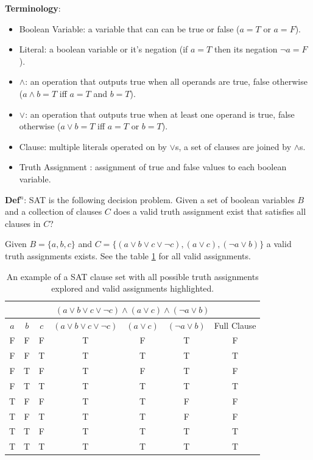 \documentclass[a4paper,11pt]{report}
\newcounter{row}
\newcounter{col}
\begin{document}
\textbf{Terminology}:
\begin{itemize}
\item Boolean Variable: a variable that can can be true or false ($a=T$ or $a=F$).
\item Literal: a boolean variable or it's negation (if $a = T$ then its negation $\neg a = F$).
\item $\land$: an operation that outputs true when all operands are true, false otherwise ($a\land b = T$ iff $a=T$ and $b=T$).
\item $\lor$: an operation that outputs true when at least one operand is true, false otherwise ($a\lor b = T$ iff $a=T$ or $b=T$).
\item Clause: multiple literals operated on by $\lor$s, a set of clauses are joined by $\land$s.
\item Truth Assignment : assignment of true and false values to each boolean variable. 
\end{itemize}

\textbf{Def$^n$}: SAT is the following decision problem. Given a set of boolean variables $B$ and a collection of clauses $C$ does a valid truth assignment exist that satisfies all clauses in $C$?

Given $B = \{a,b,c\}$ and  $C=\{(a\lor b \lor c \lor \neg c), (a \lor c), (\neg a\lor b)\}$ a valid truth assignments exists. See the table \ref{satex} for all valid assignments.

\begin{table}
\begin{center}
\begin{tabular}{ |c|c|c|c|c|c|c|  }
 \hline
 \multicolumn{7}{|c|}{$(a\lor b \lor c \lor \neg c)\land (a \lor c) \land (\neg a\lor b)$} \\
 \hline
$a$ & $b$ & $c$ & $(a\lor b \lor c \lor \neg c)$ & $(a \lor c)$ & $(\neg a\lor b)$ & Full Clause\\
 \hline
 F & F & F & T & F & T & F \\
\rowcolor{lightgray}
 F & F & T & T & T & T & T \\
 F & T & F & T & F & T & F \\
\rowcolor{lightgray}
 F & T & T & T & T & T & T \\
 T & F & F & T & T & F & F \\
 T & F & T & T & T & F & F \\
\rowcolor{lightgray}
 T & T & F & T & T & T & T \\
\rowcolor{lightgray}
 T & T & T & T & T & T & T \\
 \hline
\end{tabular}
\end{center}
\caption{\label{satex}An example of a SAT clause set with all possible truth assignments explored and valid assignments highlighted.}
\end{table}
\end{document}

